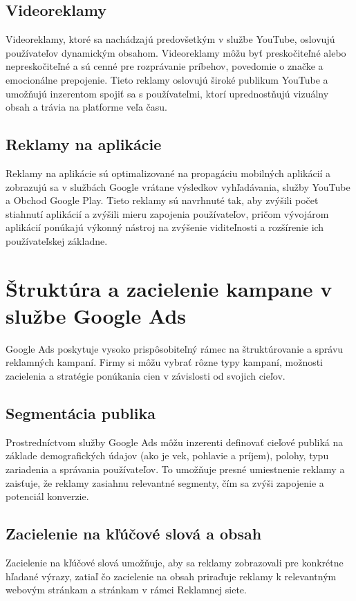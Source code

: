 \documentclass[10pt,slovak,a4paper]{article}
\begin{document}
\subsection{Videoreklamy}
Videoreklamy, ktoré sa nachádzajú predovšetkým v službe YouTube, oslovujú používateľov dynamickým obsahom. 
Videoreklamy môžu byť preskočiteľné alebo nepreskočiteľné a sú cenné pre rozprávanie príbehov, povedomie o značke a 
emocionálne prepojenie. Tieto reklamy oslovujú široké publikum YouTube a umožňujú inzerentom spojiť sa s používateľmi, 
ktorí uprednostňujú vizuálny obsah a trávia na platforme veľa času.
\subsection{Reklamy na aplikácie}
Reklamy na aplikácie sú optimalizované na propagáciu mobilných
aplikácií a zobrazujú sa v službách Google vrátane výsledkov vyhľadávania, služby YouTube a Obchod Google Play. 
Tieto reklamy sú navrhnuté tak, aby zvýšili počet stiahnutí aplikácií a zvýšili mieru zapojenia používateľov, 
pričom vývojárom aplikácií ponúkajú výkonný nástroj na zvýšenie viditeľnosti a rozšírenie ich používateľskej základne.

\section{Štruktúra a zacielenie kampane v službe Google Ads}
Google Ads poskytuje vysoko prispôsobiteľný rámec na štruktúrovanie a správu reklamných kampaní. Firmy si môžu 
vybrať rôzne typy kampaní, možnosti zacielenia a stratégie ponúkania cien v závislosti od svojich cieľov.\cite{8847128}

\subsection{Segmentácia publika}
Prostredníctvom služby Google Ads môžu inzerenti definovať cieľové publiká na základe demografických údajov 
(ako je vek, pohlavie a príjem), polohy, typu zariadenia a správania používateľov. To umožňuje presné umiestnenie 
reklamy a zaisťuje, že reklamy zasiahnu relevantné segmenty, čím sa zvýši zapojenie a potenciál konverzie.

\subsection{Zacielenie na kľúčové slová a obsah}
Zacielenie na kľúčové slová umožňuje, aby sa reklamy zobrazovali pre konkrétne hľadané výrazy, zatiaľ čo zacielenie 
na obsah priraďuje reklamy k relevantným webovým stránkam a stránkam v rámci Reklamnej siete.\cite{7273289}
\end{document}

